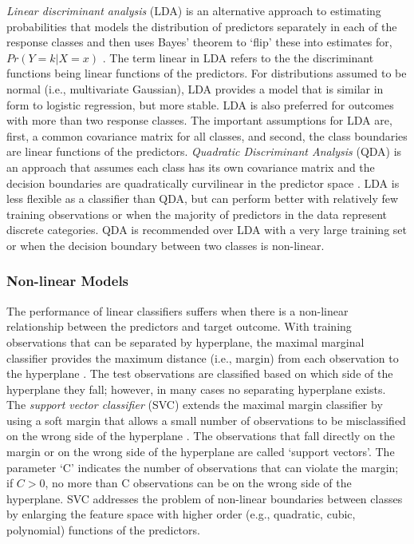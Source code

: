 \documentclass[sigconf]{acmart}
\begin{document}
\emph{Linear discriminant analysis} (LDA) is an alternative approach to 
estimating probabilities that models the distribution of predictors 
separately in each of the response classes and then uses Bayes' theorem 
to `flip' these into estimates for, $Pr(Y=k | X=x)$ \cite{james13}. The term 
linear in LDA refers to the the discriminant functions being linear functions 
of the predictors. For distributions assumed to be normal (i.e., multivariate 
Gaussian), LDA provides a model that is similar in form to logistic regression, 
but more stable. LDA is also preferred for outcomes with more than two response 
classes. The important assumptions for LDA are, first, a common covariance 
matrix for all classes, and second, the class boundaries are linear functions 
of the predictors. \emph{Quadratic Discriminant Analysis} (QDA) is an approach 
that assumes each class has its own covariance matrix and the decision 
boundaries are quadratically curvilinear in the predictor space \cite{kuhn13}. 
LDA is less flexible as a classifier than QDA, but can perform better with 
relatively few training observations or when the majority of predictors in the 
data represent discrete categories. QDA is recommended over LDA with a very 
large training set or when the decision boundary between two classes is 
non-linear. 


\subsubsection{Non-linear Models}

The performance of linear classifiers suffers when there is a non-linear 
relationship between the predictors and target outcome. With training
observations that can be separated by hyperplane, the maximal marginal 
classifier provides the maximum distance (i.e., margin) from each observation
to the hyperplane \cite{james13}. The test observations are classified based 
on which side of the hyperplane they fall; however, in many cases no separating 
hyperplane exists. The \emph{support vector classifier} (SVC) extends the 
maximal margin classifier by using a soft margin that allows a small number 
of observations to be misclassified on the wrong side of the hyperplane 
\cite{kuhn13, cortes95}. The observations that fall directly on the margin or 
on the wrong side of the hyperplane are called `support vectors'. The parameter 
`C' indicates the number of observations that can violate the margin; if $C>0$, 
no more than C observations can be on the wrong side of the hyperplane. 
SVC addresses the problem of non-linear boundaries between classes by 
enlarging the feature space with higher order (e.g., quadratic, cubic, 
polynomial) functions of the predictors. 
\end{document}
